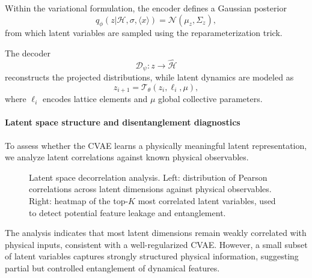 \documentclass[11pt,a4paper]{article}
\begin{document}
\begin{sloppypar}
Within the variational formulation, the encoder defines a Gaussian posterior
\begin{equation}
q_{\phi}(z|\mathcal{H},\sigma,\langle x\rangle)
=
\mathcal{N}(\mu_z,\Sigma_z),
\end{equation}
from which latent variables are sampled using the reparameterization trick.

The decoder
\begin{equation}
\mathcal{D}_{\psi}: z \rightarrow \widehat{\mathcal{H}}
\end{equation}
reconstructs the projected distributions, while latent dynamics are modeled as
\begin{equation}
z_{i+1} = \mathcal{T}_\theta(z_i, \ell_i, \mu),
\end{equation}
where $\ell_i$ encodes lattice elements and $\mu$ global collective parameters.

\paragraph{Latent space structure and disentanglement diagnostics}

To assess whether the CVAE learns a physically meaningful latent representation, we analyze latent correlations against known physical observables.

\begin{figure}[H]
\centering
\caption{\small Latent space decorrelation analysis. Left: distribution of Pearson correlations across latent dimensions against physical observables. Right: heatmap of the top-$K$ most correlated latent variables, used to detect potential feature leakage and entanglement.}
\label{fig:latent_corr}
\end{figure}

The analysis indicates that most latent dimensions remain weakly correlated with physical inputs, consistent with a well-regularized CVAE. However, a small subset of latent variables captures strongly structured physical information, suggesting partial but controlled entanglement of dynamical features.


\end{sloppypar}
\end{document}

